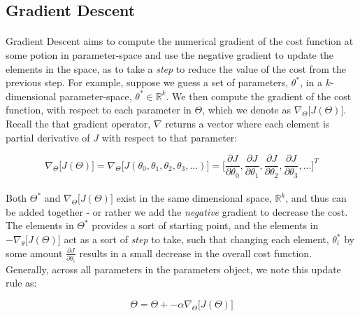 \documentclass[12pt,letterpaper]{article}
\begin{document}
\subsection{Gradient Descent}

\paragraph*{}Gradient Descent aims to compute the numerical gradient of the cost function at some potion in parameter-space and use the negative gradient to update the elements in the space, as to take a \textit{step} to reduce the value of the cost from the previous step. For example, suppose we guess a set of parameters, $\theta^*$, in a $k$-dimensional parameter-space, $\theta^* \in \mathbb{R}^k$. We then compute the gradient of the cost function, with respect to each parameter in $\Theta$, which we denote as $\nabla_\Theta \big[ J(\Theta) \big]$. Recall the that gradient operator, $\nabla$ returns a vector where each element is partial derivative of $J$ with respect to that parameter:

\begin{equation}
\label{cost gradient}
\nabla_\Theta \big[ J(\Theta) \big] = \nabla_\Theta \big[ J(\theta_0, \theta_1,\theta_2,\theta_3,...) \big] =
\Big[ \frac{\partial J}{\partial \theta_0}, \frac{\partial J}{\partial \theta_1}, 
		\frac{\partial J}{\partial \theta_2}, \frac{\partial J}{\partial \theta_3}, ... \Big]^T
\end{equation}

\paragraph*{}Both $\Theta^*$ and $\nabla_\Theta \big[ J(\Theta) \big]$ exist in the same dimensional space, $\mathbb{R}^k$, and thus can be added together - or rather we add the \textit{negative} gradient to decrease the cost. The elements in $\Theta^*$ provides a sort of starting point, and the elements in $-\nabla_\theta \big[ J(\Theta) \big]$ act as a sort of \textit{step} to take, such that changing each element, $\theta^*_i$ by some amount $\frac{\partial J}{\partial \theta_i}$ results in a small decrease in the overall cost function. Generally, across all parameters in the parameters object, we note this update rule as:

\begin{equation}
\label{gradient update}
\Theta = \Theta + -\alpha \nabla_\Theta \big[ J(\Theta) \big]
\end{equation}
\end{document}
